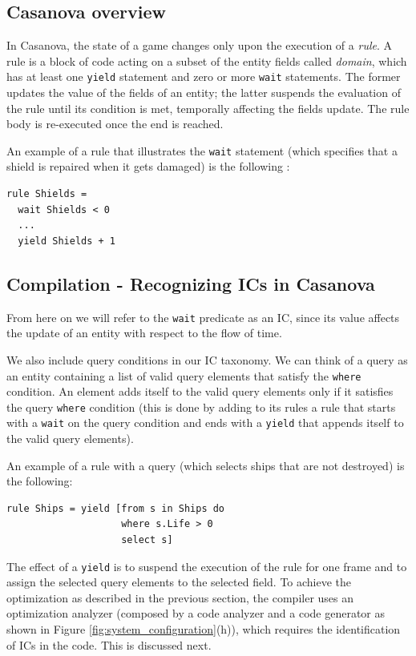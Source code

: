 \subsection{Casanova overview}
In Casanova, the state of a game changes only upon the execution of a \textit{rule}. A rule is a block of code acting on a subset of the entity fields called \textit{domain}, which has at least one \texttt{yield} statement and zero or more \texttt{wait} statements. The former updates the value of the fields of an entity; the latter suspends the evaluation of the rule until its condition is met, temporally affecting the fields update. The rule body is re-executed once the end is reached.

An example of a rule that illustrates the \texttt{wait} statement (which specifies that a shield is repaired when it gets damaged) is the following :
\begin{lstlisting}
rule Shields = 
  wait Shields < 0
  ...
  yield Shields + 1
\end{lstlisting}

\subsection{Compilation - Recognizing ICs in Casanova}
From here on we will refer to the \texttt{wait} predicate as an IC, since its value affects the update of an entity with respect to the flow of time.

We also include query conditions in our IC taxonomy. We can think of a query as an entity containing a list of valid query elements that satisfy the \texttt{where} condition. An element adds itself to the valid query elements only if it satisfies the query \texttt{where} condition (this is done by adding to its rules a rule that starts with a \texttt{wait} on the query condition and ends with a \texttt{yield} that appends itself to the valid query elements).

An example of a rule with a query (which selects ships that are not destroyed) is the following:
\begin{lstlisting}
rule Ships = yield [from s in Ships do
                    where s.Life > 0
                    select s]
\end{lstlisting}
The effect of a \texttt{yield} is to suspend the execution of the rule for one frame and to assign the selected query elements to the selected field. To achieve the optimization as described in the previous section, the compiler uses an optimization analyzer (composed by a code analyzer and a code generator as shown in Figure \ref{fig:system_configuration}(h)), which requires the identification of ICs in the code. This is discussed next.

